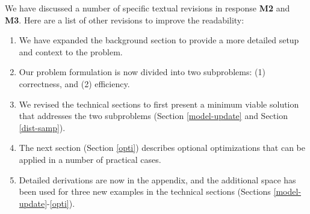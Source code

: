 We have discussed a number of specific textual revisions in response \textbf{M2} and \textbf{M3}. Here are a list of other revisions to improve the readability:

\begin{enumerate}
\item We have expanded the background section to provide a more detailed setup and context to the problem.
\item Our problem formulation is now divided into two subproblems: (1) correctness, and (2) efficiency.
\item We revised the technical sections to first present a minimum viable solution that addresses the two subproblems (Section \ref{model-update} and Section  \ref{dist-samp}).
\item The next section (Section \ref{opti}) describes optional optimizations that can be applied in a number of practical cases.
\item Detailed derivations are now in the appendix, and the additional space has been used for three new examples in the technical sections (Sections \ref{model-update}-\ref{opti}).
\end{enumerate}
